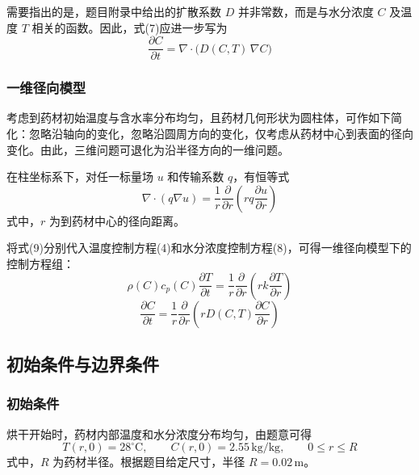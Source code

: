 \documentclass[withoutpreface,bwprint]{cumcm_thesis}
\begin{document}
需要指出的是，题目附录中给出的扩散系数 \(D\) 并非常数，而是与水分浓度 \(C\) 及温度 \(T\) 相关的函数。因此，式(7)应进一步写为
\begin{equation}
\frac{\partial C}{\partial t} = \nabla \cdot \bigl( D(C,T) \, \nabla C \bigr)
\end{equation}

\subsubsection{一维径向模型}

考虑到药材初始温度与含水率分布均匀，且药材几何形状为圆柱体，可作如下简化：忽略沿轴向的变化，忽略沿圆周方向的变化，仅考虑从药材中心到表面的径向变化。由此，三维问题可退化为沿半径方向的一维问题。

在柱坐标系下，对任一标量场 \(u\) 和传输系数 \(q\)，有恒等式
\begin{equation}
\nabla \cdot (q \nabla u) = \frac{1}{r} \frac{\partial}{\partial r} \left( r q \frac{\partial u}{\partial r} \right)
\end{equation}
式中，\(r\) 为到药材中心的径向距离。

将式(9)分别代入温度控制方程(4)和水分浓度控制方程(8)，可得一维径向模型下的控制方程组：
\begin{equation}
\rho(C) c_p(C) \frac{\partial T}{\partial t} = \frac{1}{r} \frac{\partial}{\partial r} \left( r k \frac{\partial T}{\partial r} \right)
\end{equation}
\begin{equation}
\frac{\partial C}{\partial t} = \frac{1}{r} \frac{\partial}{\partial r} \left( r D(C,T) \frac{\partial C}{\partial r} \right)
\end{equation}

\subsection{初始条件与边界条件}

\subsubsection{初始条件}

烘干开始时，药材内部温度和水分浓度分布均匀，由题意可得
\begin{equation}
T(r,0) = 28^\circ\text{C}, \qquad C(r,0) = 2.55\,\text{kg/kg}, \qquad 0 \le r \le R
\end{equation}
式中，\(R\) 为药材半径。根据题目给定尺寸，半径 \(R = 0.02\,\text{m}\)。
\end{document}
